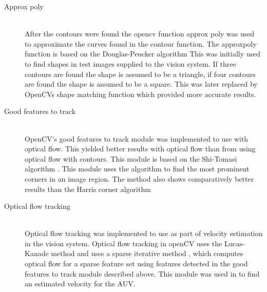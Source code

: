 \begin{description}
\item[Approx poly]\hfill \\
After the contours were found the opencv function approx poly was used to approximate the curves found in the contour function. The approxpoly function is based on the Douglas-Peucker algorithm \cite{article:douglas}
This was initially used to find shapes in test images supplied to the vision system. If three contours are found the shape is assumed to be a triangle, if four contours are found the shape is assumed to be a square. This was later replaced by OpenCVs shape matching function which provided more accurate results.

\item[Good features to track]\hfill \\
OpenCV's good features to track module was implemented to use with optical flow. This yielded better results with optical flow than from using optical flow with contours. This module is based on the Shi-Tomasi algorithm \cite{article:tomasi}. This module uses the algorithm to find the most prominent corners in an image region. The method also shows comparatively better results than the Harris corner algorithm \cite{article:tomasi}

\item[Optical flow tracking]\hfill \\
Optical flow tracking was implemented to use as part of velocity estimation in the vision system. Optical flow tracking in openCV uses the Lucas-Kanade method and uses a sparse iterative method \cite{web:opticalFlow}, which computes optical flow for a sparse feature set using features detected in the good features to track module described above. This module was used in to find an estimated velocity for the AUV.

\end{description}

